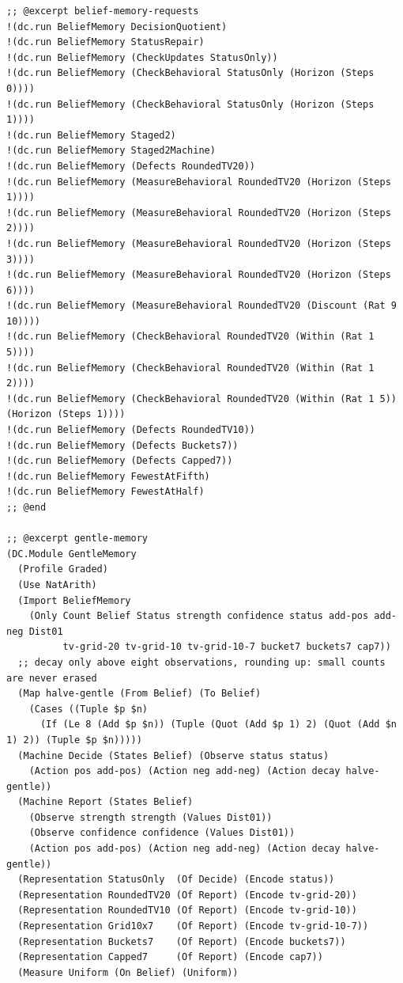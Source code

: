 \documentclass[11pt]{article}
\theoremstyle{definition}
\theoremstyle{plain}
\begin{document}
\begin{lstlisting}[style=mettafull]
;; @excerpt belief-memory-requests
!(dc.run BeliefMemory DecisionQuotient)
!(dc.run BeliefMemory StatusRepair)
!(dc.run BeliefMemory (CheckUpdates StatusOnly))
!(dc.run BeliefMemory (CheckBehavioral StatusOnly (Horizon (Steps 0))))
!(dc.run BeliefMemory (CheckBehavioral StatusOnly (Horizon (Steps 1))))
!(dc.run BeliefMemory Staged2)
!(dc.run BeliefMemory Staged2Machine)
!(dc.run BeliefMemory (Defects RoundedTV20))
!(dc.run BeliefMemory (MeasureBehavioral RoundedTV20 (Horizon (Steps 1))))
!(dc.run BeliefMemory (MeasureBehavioral RoundedTV20 (Horizon (Steps 2))))
!(dc.run BeliefMemory (MeasureBehavioral RoundedTV20 (Horizon (Steps 3))))
!(dc.run BeliefMemory (MeasureBehavioral RoundedTV20 (Horizon (Steps 6))))
!(dc.run BeliefMemory (MeasureBehavioral RoundedTV20 (Discount (Rat 9 10))))
!(dc.run BeliefMemory (CheckBehavioral RoundedTV20 (Within (Rat 1 5))))
!(dc.run BeliefMemory (CheckBehavioral RoundedTV20 (Within (Rat 1 2))))
!(dc.run BeliefMemory (CheckBehavioral RoundedTV20 (Within (Rat 1 5)) (Horizon (Steps 1))))
!(dc.run BeliefMemory (Defects RoundedTV10))
!(dc.run BeliefMemory (Defects Buckets7))
!(dc.run BeliefMemory (Defects Capped7))
!(dc.run BeliefMemory FewestAtFifth)
!(dc.run BeliefMemory FewestAtHalf)
;; @end

;; @excerpt gentle-memory
(DC.Module GentleMemory
  (Profile Graded)
  (Use NatArith)
  (Import BeliefMemory
    (Only Count Belief Status strength confidence status add-pos add-neg Dist01
          tv-grid-20 tv-grid-10 tv-grid-10-7 bucket7 buckets7 cap7))
  ;; decay only above eight observations, rounding up: small counts are never erased
  (Map halve-gentle (From Belief) (To Belief)
    (Cases ((Tuple $p $n)
      (If (Le 8 (Add $p $n)) (Tuple (Quot (Add $p 1) 2) (Quot (Add $n 1) 2)) (Tuple $p $n)))))
  (Machine Decide (States Belief) (Observe status status)
    (Action pos add-pos) (Action neg add-neg) (Action decay halve-gentle))
  (Machine Report (States Belief)
    (Observe strength strength (Values Dist01))
    (Observe confidence confidence (Values Dist01))
    (Action pos add-pos) (Action neg add-neg) (Action decay halve-gentle))
  (Representation StatusOnly  (Of Decide) (Encode status))
  (Representation RoundedTV20 (Of Report) (Encode tv-grid-20))
  (Representation RoundedTV10 (Of Report) (Encode tv-grid-10))
  (Representation Grid10x7    (Of Report) (Encode tv-grid-10-7))
  (Representation Buckets7    (Of Report) (Encode buckets7))
  (Representation Capped7     (Of Report) (Encode cap7))
  (Measure Uniform (On Belief) (Uniform))


\end{lstlisting}
\end{document}
